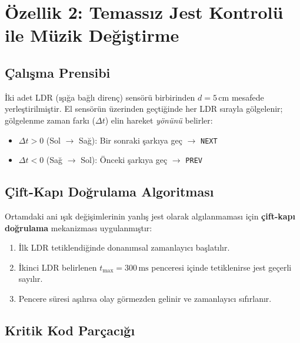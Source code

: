 \documentclass[12pt, a4paper]{article}
\begin{document}
\section{Özellik 2: Temassız Jest Kontrolü ile Müzik Değiştirme}

\subsection{Çalışma Prensibi}

İki adet LDR (ışığa bağlı direnç) sensörü birbirinden $d = 5\,\mathrm{cm}$ mesafede
yerleştirilmiştir. El sensörün üzerinden geçtiğinde her LDR sırayla gölgelenir;
gölgelenme zaman farkı ($\Delta t$) elin hareket \textit{yönünü} belirler:

\begin{itemize}[leftmargin=*]
  \item $\Delta t > 0$ (Sol $\to$ Sağ): Bir sonraki şarkıya geç $\to$ \texttt{NEXT}
  \item $\Delta t < 0$ (Sağ $\to$ Sol): Önceki şarkıya geç $\to$ \texttt{PREV}
\end{itemize}

\subsection{Çift-Kapı Doğrulama Algoritması}

Ortamdaki ani ışık değişimlerinin yanlış jest olarak algılanmaması için
\textbf{çift-kapı doğrulama} mekanizması uygulanmıştır:

\begin{enumerate}[leftmargin=*, label=\arabic*.]
  \item İlk LDR tetiklendiğinde donanımsal zamanlayıcı başlatılır.
  \item İkinci LDR belirlenen $t_{\max} = 300\,\mathrm{ms}$ penceresi içinde
        tetiklenirse jest geçerli sayılır.
  \item Pencere süresi aşılırsa olay görmezden gelinir ve zamanlayıcı sıfırlanır.
\end{enumerate}

\subsection{Kritik Kod Parçacığı}
\end{document}
